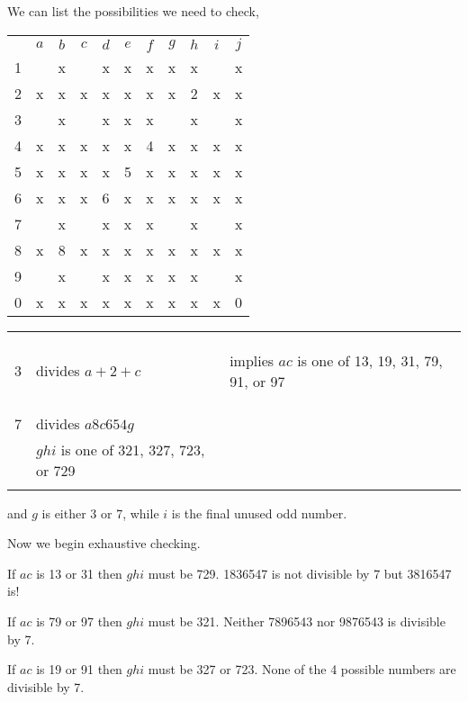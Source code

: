 We can list the possibilities we need to check,
\begin{center}
\begin{tabular}{ccccccccccc}
			&	$a$	&	$b$	&	$c$	&	$d$	&	$e$	&	$f$	&	$g$	&	$h$	&	$i$	&	$j$	\\
	1		&		&	x	&		&	x	&	x	&	x	&	x	&	x	&		&	x	\\
	2		&	x	&	x	&	x	&	x	&	x	&	x	&	x	&	2	&	x	&	x	\\
	3		&		&	x	&		&	x	&	x	&	x	&		&	x	&		&	x	\\
	4		&	x	&	x	&	x	&	x	&	x	&	4	&	x	&	x	&	x	&	x	\\
	5		&	x	&	x	&	x	&	x	&	5	&	x	&	x	&	x	&	x	&	x	\\
	6		&	x	&	x	&	x	&	6	&	x	&	x	&	x	&	x	&	x	&	x	\\
	7		&		&	x	&		&	x	&	x	&	x	&		&	x	&		&	x	\\
	8		&	x	&	8	&	x	&	x	&	x	&	x	&	x	&	x	&	x	&	x	\\
	9		&		&	x	&		&	x	&	x	&	x	&	x	&	x	&		&	x	\\
	0		&	x	&	x	&	x	&	x	&	x	&	x	&	x	&	x	&	x	&	0	\\
\end{tabular}
\hspace{1cm}\vline\hspace{1cm}
\begin{tabular}{rll}
	& 		\\
	& 		\\
	& 		\\
	3	&	divides $a+2+c$		& implies $ac$ is one of 13, 19, 31, 79, 91, or 97 \\
	& 		\\
	&		\\
	&		\\
	7	&	divides $a8c654g$	\\
		&	$ghi$ is one of 321, 327, 723, or 729 \\
		&	
		&	
\end{tabular}
\end{center}
and $g$ is either 3 or 7, while $i$ is the final unused odd number.

Now we begin exhaustive checking.

If $ac$ is 13 or 31 then $ghi$ must be 729.  1836547 is not divisible by 7 but 3816547 is!

If $ac$ is 79 or 97 then $ghi$ must be 321.  Neither 7896543 nor 9876543 is divisible by 7.

If $ac$ is 19 or 91 then $ghi$ must be 327 or 723.  None of the 4 possible numbers are divisible by 7.

